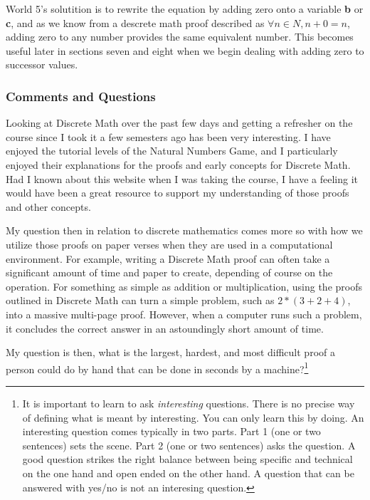 \documentclass{article}
\theoremstyle{theorem}
\theoremstyle{definition}
\theoremstyle{remark}
\begin{document}
World 5's solutition is to rewrite the equation by adding zero onto a variable \textbf{b} or \textbf{c}, and as we know from a descrete math proof described as $\forall n \in N,n+0=n$, adding zero to any number provides the same equivalent number. This becomes useful later in sections seven and eight when we begin dealing with adding zero to successor values. 

%
%

\subsubsection{Comments and Questions}

Looking at Discrete Math over the past few days and getting a refresher on the course since I took it a few semesters ago has been very interesting. I have enjoyed the tutorial levels of the Natural Numbers Game, and I particularly enjoyed their explanations for the proofs and early concepts for Discrete Math. Had I known about this website when I was taking the course, I have a feeling it would have been a great resource to support my understanding of those proofs and other concepts. 

My question then in relation to discrete mathematics comes more so with how we utilize those proofs on paper verses when they are used in a computational environment. For example, writing a Discrete Math proof can often take a significant amount of time and paper to create, depending of course on the operation. For something as simple as addition or multiplication, using the proofs outlined in Discrete Math can turn a simple problem, such as $2*(3+2+4)$, into a massive multi-page proof. However, when a computer runs such a problem, it concludes the correct answer in an astoundingly short amount of time.

My question is then, what is the largest, hardest, and most difficult proof a person could do by hand that can be done in seconds by a machine?\footnote{It is important to learn to ask \emph{interesting} questions. There is no precise way of defining what is meant by interesting. You can only learn this by doing. An interesting question comes typically in two parts. Part 1 (one or two sentences) sets the scene. Part 2 (one or two sentences) asks the question. A good question strikes the right balance between being specific and technical on the one hand and open ended on the other hand. A question that can be answered with yes/no is not an interesing question.}
\end{document}
